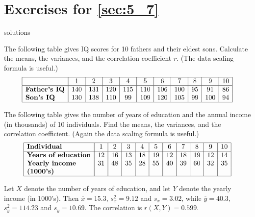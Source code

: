 \section*{Exercises for \ref{sec:5_7}}

\begin{Filesave}{solutions}
\end{Filesave}

\begin{ex}
The following table gives IQ scores for 10 fathers and their eldest sons. 
Calculate the means, the variances, and the correlation coefficient $r$. (The data scaling formula is useful.)
\begin{equation*}
\begin{array}{|l|c|c|c|c|c|c|c|c|c|c|}
\hline
							&   1 &   2 &   3 &   4 &   5 &   6 &   7 &   8 &   9 &  10 \\ \hline
\textbf{\mbox{Father's IQ}} & 140 & 131 & 120 & 115 & 110 & 106 & 100 &  95 &  91 &  86 \\ 
\textbf{\mbox{Son's IQ}} 	& 130 & 138 & 110 &  99 & 109 & 120 & 105 &  99 & 100 &  94 \\ \hline
\end{array}
\end{equation*}
\end{ex}

\begin{ex}
The following table gives the number of years of education and the annual income (in thousands) of 10 individuals. Find the means, the variances, and the correlation coefficient. (Again the data scaling formula is useful.)
\begin{equation*}
\begin{array}{|l|c|c|c|c|c|c|c|c|c|c|}
\hline
\textbf{\mbox{Individual}} 			&  1 &  2 &  3 &  4 &  5 &  6 &  7 &  8 &  9 & 10 \\ \hline
\textbf{\mbox{Years of education}} 	& 12 & 16 & 13 & 18 & 19 & 12 & 18 & 19 & 12 & 14 \\ 
\textbf{\mbox{Yearly income}} 		& 31 & 48 & 35 & 28 & 55 & 40 & 39 & 60 & 32 & 35 \\
\textbf{\mbox{(1000's)}} &&&&&&&&&& \\ \hline
\end{array}
\end{equation*}
\begin{sol}
Let $X$ denote the number of years of education, and let $Y$ denote the yearly income (in 1000's). Then $\overline{x} = 15.3$, $s_x^2 = 9.12$ and $s_{x} = 3.02$, while $\overline{y} = 40.3$, $s_y^2 = 114.23$ and $s_{y} = 10.69$. The correlation is $r(X, Y) = 0.599$.
\end{sol}
\end{ex}

